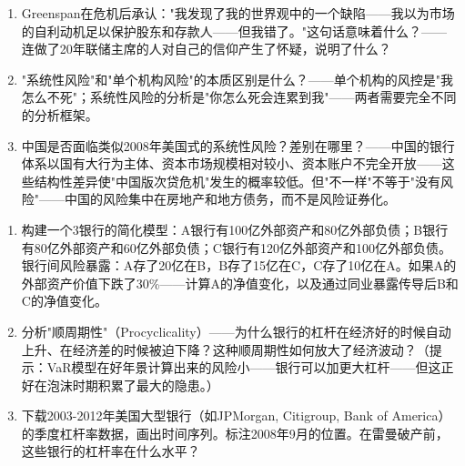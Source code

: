 \documentclass[a4paper,11pt]{ctexbook}
\begin{document}
\begin{discuss}
\begin{enumerate}
  \item Greenspan在危机后承认："我发现了我的世界观中的一个缺陷——我以为市场的自利动机足以保护股东和存款人——但我错了。"这句话意味着什么？——连做了20年联储主席的人对自己的信仰产生了怀疑，说明了什么？
  \item "系统性风险"和"单个机构风险"的本质区别是什么？——单个机构的风控是"我怎么不死"；系统性风险的分析是"你怎么死会连累到我"——两者需要完全不同的分析框架。
  \item 中国是否面临类似2008年美国式的系统性风险？差别在哪里？——中国的银行体系以国有大行为主体、资本市场规模相对较小、资本账户不完全开放——这些结构性差异使"中国版次贷危机"发生的概率较低。但"不一样"不等于"没有风险"——中国的风险集中在房地产和地方债务，而不是风险证券化。
\end{enumerate}
\end{discuss}

\begin{exercises}
\begin{enumerate}
  \item 构建一个3银行的简化模型：A银行有100亿外部资产和80亿外部负债；B银行有80亿外部资产和60亿外部负债；C银行有120亿外部资产和100亿外部负债。银行间风险暴露：A存了20亿在B，B存了15亿在C，C存了10亿在A。如果A的外部资产价值下跌了30\%——计算A的净值变化，以及通过同业暴露传导后B和C的净值变化。
  \item 分析"顺周期性"（Procyclicality）——为什么银行的杠杆在经济好的时候自动上升、在经济差的时候被迫下降？这种顺周期性如何放大了经济波动？（提示：VaR模型在好年景计算出来的风险小——银行可以加更大杠杆——但这正好在泡沫时期积累了最大的隐患。）
  \item 下载2003-2012年美国大型银行（如JPMorgan, Citigroup, Bank of America）的季度杠杆率数据，画出时间序列。标注2008年9月的位置。在雷曼破产前，这些银行的杠杆率在什么水平？
\end{enumerate}
\end{exercises}


\newpage
\end{document}
